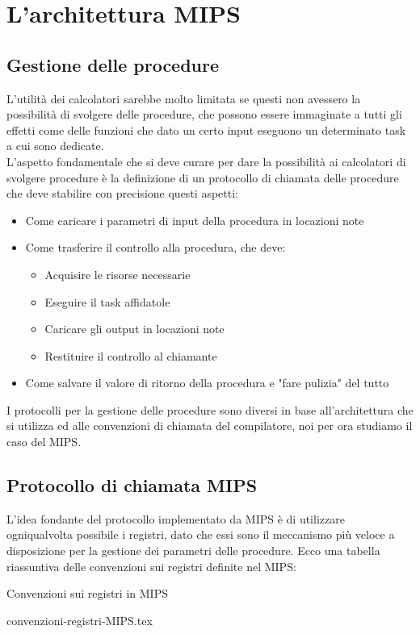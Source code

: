 \documentclass[class=book, crop=false]{standalone}
\begin{document}
\chapter{L'architettura MIPS}
\section{Gestione delle procedure}
L'utilità dei calcolatori sarebbe molto limitata se questi non avessero la possibilità di svolgere delle procedure, che possono essere immaginate a tutti gli effetti come delle funzioni che dato un certo input eseguono un determinato task a cui sono dedicate.\\
L'aspetto fondamentale che si deve curare per dare la possibilità ai calcolatori di svolgere procedure è la definizione di un protocollo di chiamata delle procedure che deve stabilire con precisione questi aspetti:
\begin{itemize}[noitemsep]
	\item Come caricare i parametri di input della procedura in locazioni note
	\item Come trasferire il controllo alla procedura, che deve:
		\begin{itemize}[nolistsep, noitemsep]
			\item Acquisire le risorse necessarie
			\item Eseguire il task affidatole
			\item Caricare gli output in locazioni note
			\item Restituire il controllo al chiamante
		\end{itemize}
	\item Come salvare il valore di ritorno della procedura e "fare pulizia" del tutto
\end{itemize}
I protocolli per la gestione delle procedure sono diversi in base all'architettura che si utilizza ed alle convenzioni di chiamata del compilatore, noi per ora studiamo il caso del MIPS.

\section{Protocollo di chiamata MIPS}
L'idea fondante del protocollo implementato da MIPS è di utilizzare ogniqualvolta possibile i registri, dato che essi sono il meccanismo più veloce a disposizione per la gestione dei parametri delle procedure. Ecco una tabella riassuntiva delle convenzioni sui registri definite nel MIPS:

\begin{table}[H]
	\centering
	\caption{Convenzioni sui registri in MIPS}
	{convenzioni-registri-MIPS.tex}
\end{table}
\end{document}
